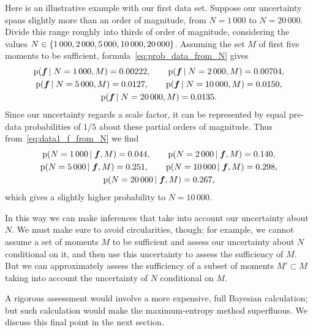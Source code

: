 \documentclass[\ifafour a4paper,12pt,\else a5paper,10pt,\fi%
onecolumn,oneside,article,%
british%
]{memoir}
\theoremstyle{remark}
\theoremstyle{innote}
\DeclarePairedDelimiter\set{\{}{\}}
\newcommand*{\pf}{\mathrm{p}}%
\renewcommand*{\|}{\nonscript\,\vert\nonscript\;\mathopen{}}
\newcommand*{\yff}{f}
\newcommand*{\yf}{\bm{\yff}}
\begin{document}
Here is an illustrative example with our first data set. Suppose our
uncertainty spans slightly more than an order of magnitude, from $N=1\,000$
to $N=20\,000$. Divide this range roughly into thirds of order of
magnitude, considering the values
$N\in \set{1\,000, 2\,000, 5\,000, 10\,000, 20\,000}$. Assuming the set $M$
of first five moments to be sufficient, formula~\eqref{eq:prob_data_from_N}
gives
\begin{equation}
  \label{eq:data1_f_from_N}
  \begin{gathered}
  \pf(\yf \| N=1\,000, M) =  0.00222,\qquad
  \pf(\yf \| N=2\,000, M) =  0.00704,\\
  \pf(\yf \| N=5\,000, M) =  0.0127,\qquad
  \pf(\yf \| N=10\,000, M) =  0.0150,\\
  \pf(\yf \| N=20\,000, M) =  0.0135.
\end{gathered}
\end{equation}
Since our uncertainty regards a scale factor, it can be represented by
equal pre-data probabilities of $1/5$ about these partial orders of
magnitude. Thus from~\eqref{eq:data1_f_from_N} we find
\begin{equation}
  \label{eq:data1_N_from_f}
  \begin{gathered}
  \pf(N=1\,000 \| \yf, M) =  0.044,\qquad
  \pf(N=2\,000 \| \yf, M) =  0.140,\\
  \pf(N=5\,000 \| \yf, M) =  0.251,\qquad
  \pf(N=10\,000 \| \yf, M) =  0.298,\\
  \pf(N=20\,000 \| \yf, M) =  0.267,
\end{gathered}
\end{equation}
which gives a slightly higher probability to $N=10\,000$.

\bigskip

In this way we can make inferences %
that take into account our uncertainty about $N$. We must make sure to
avoid circularities, though: for example, we cannot assume a set of moments
$M$ to be sufficient and assess our uncertainty about $N$ conditional on
it, and then use this uncertainty to assess the sufficiency of $M$. But we
can approximately assess the sufficiency of a subset of moments
$M' \subset M$ taking into account the uncertainty of $N$ conditional on
$M$.

A rigorous assessment would involve a more expensive, full Bayesian
calculation; but such calculation would make the maximum-entropy
method superfluous. We discuss this final point in the next section.
\end{document}

